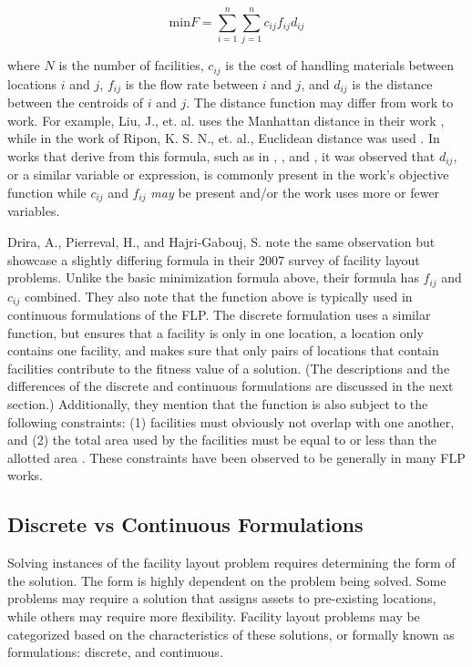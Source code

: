 $$
\text{min} F = \sum_{i=1}^{n}\sum_{j=1}^{n}c_{ij}f_{ij}d_{ij}
$$

where $N$ is the number of facilities, $c_{ij}$ is the cost of handling materials between locations $i$ and $j$, $f_{ij}$ is the flow rate between $i$ and $j$, and $d_{ij}$ is the distance between the centroids of $i$ and $j$. The distance function may differ from work to work. For example, Liu, J., et. al. uses the Manhattan distance in their work \cite{Liu2018}, while in the work of Ripon, K. S. N., et. al., Euclidean distance was used \cite{Ripon2013}. In works that derive from this formula, such as in \cite{Farmakis2018}, \cite{Solimanpur2008}, and \cite{Peng2018}, it was observed that $d_{ij}$, or a similar variable or expression, is commonly present in the work's objective function while $c_{ij}$ and $f_{ij}$ \textit{may} be present and/or the work uses more or fewer variables.

Drira, A., Pierreval, H., and Hajri-Gabouj, S. note the same observation but showcase a slightly differing formula in their 2007 survey of facility layout problems. Unlike the basic minimization formula above, their formula has $f_{ij}$ and $c_{ij}$ combined. They also note that the function above is typically used in continuous formulations of the FLP. The discrete formulation uses a similar function, but ensures that a facility is only in one location, a location only contains one facility, and makes sure that only pairs of locations that contain facilities contribute to the fitness value of a solution. (The descriptions and the differences of the discrete and continuous formulations are discussed in the next section.) Additionally, they mention that the function is also subject to the following constraints: (1) facilities must obviously not overlap with one another, and (2) the total area used by the facilities must be equal to or less than the allotted area \cite{Drira2007}. These constraints have been observed to be generally in many FLP works.

\subsection{Discrete vs Continuous Formulations}
Solving instances of the facility layout problem requires determining the form of the solution. The form is highly dependent on the problem being solved. Some problems may require a solution that assigns assets to pre-existing locations, while others may require more flexibility. Facility layout problems may be categorized based on the characteristics of these solutions, or formally known as formulations: discrete, and continuous.

